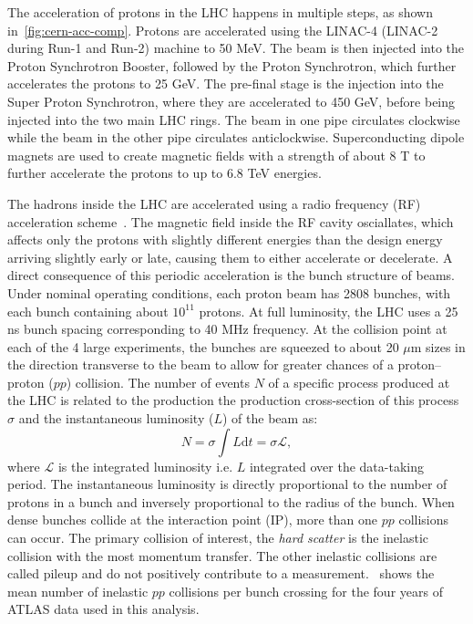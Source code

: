 The acceleration of protons in the LHC happens in multiple steps, as shown in~\cref{fig:cern-acc-comp}. Protons are accelerated using the LINAC-4 (LINAC-2 during Run-1 and Run-2) machine to 50 MeV. The beam is then injected into the Proton Synchrotron Booster, followed by the Proton Synchrotron, which further accelerates the protons to 25 GeV. The pre-final stage is the injection into the Super Proton Synchrotron, where they are accelerated to 450 GeV, before being injected into the two main LHC rings. The beam in one pipe circulates clockwise while the beam in the other pipe circulates anticlockwise. Superconducting dipole magnets are used to create magnetic fields with a strength of about 8 T to further accelerate the protons to up to 6.8 TeV energies. 

The hadrons inside the LHC are accelerated using a radio frequency (RF) acceleration scheme~\cite{LHC}. The magnetic field inside the RF cavity osciallates, which affects only the protons with slightly different energies than the design energy arriving slightly early or late, causing them to either accelerate or decelerate. A direct consequence of this periodic acceleration is the bunch structure of beams. Under nominal operating conditions, each proton beam has 2808 bunches, with each bunch containing about $10^{11}$ protons. At full luminosity, the LHC uses a 25 ns bunch spacing corresponding to 40 MHz frequency. At the collision point at each of the 4 large experiments, the bunches are squeezed to about 20 $\mu$m sizes in the direction transverse to the beam to allow for greater chances of a proton--proton ($pp$) collision. The number of events $N$ of a specific process produced at the LHC is related to the production the production cross-section of this process $\sigma$ and the instantaneous luminosity ($L$) of the beam as:
\begin{equation}
    N = \sigma\int L \mathrm{d}t = \sigma \mathcal{L},
\end{equation}
where $\mathcal{L}$ is the integrated luminosity i.e. $L$ integrated over the data-taking period. The instantaneous luminosity is directly proportional to the number of protons in a bunch and inversely proportional to the radius of the bunch. When dense bunches collide at the interaction point (IP), more than one $pp$ collisions can occur. The primary collision of interest, the \textit{hard scatter} is the inelastic collision with the most momentum transfer. The other inelastic collisions are called pileup and do not positively contribute to a measurement.~ shows the mean number of inelastic $pp$ collisions per bunch crossing for the four years of ATLAS data used in this analysis.

